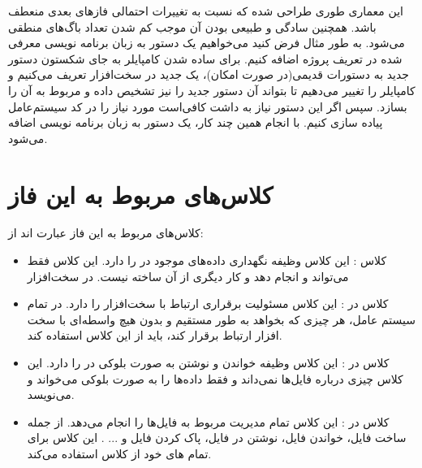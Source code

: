\documentclass{article}
\begin{document}
این معماری طوری طراحی شده که نسبت به تغییرات احتمالی فازهای بعدی منعطف باشد. همچنین سادگی و طبیعی بودن آن موجب کم شدن تعداد باگ‌های منطقی می‌شود. به طور مثال فرض کنید می‌خواهیم یک دستور به زبان برنامه نویسی معرفی شده در تعریف پروژه اضافه کنیم. برای ساده شدن کامپایلر به جای شکستون دستور جدید به دستورات قدیمی(در صورت امکان)، یک 
جدید در سخت‌افزار تعریف می‌کنیم و کامپایلر را تغییر می‌دهیم تا بتواند آن دستور جدید را نیز تشخیص داده و 
مربوط به آن‌ را بسازد. سپس اگر این دستور نیاز به 
داشت کافی‌است 
مورد نیاز را در کد سیستم‌عامل پیاده سازی کنیم. با انجام همین چند کار، یک دستور به زبان برنامه نویسی اضافه می‌شود. 

\section{کلاس‌های مربوط به این فاز}
کلاس‌های مربوط به این فاز عبارت اند از: 
\begin{itemize} 
\item
کلاس 
: 
این کلاس وظیفه نگهداری داده‌های موجود در 
را دارد. این کلاس فقط می‌تواند 
و 
انجام دهد و کار دیگری از آن ساخته نیست. 
در 
سخت‌افزار
\item
کلاس 
در 
:
این کلاس مسئولیت برقراری ارتباط با سخت‌افزار را دارد. در تمام سیستم عامل، هر چیزی که بخواهد به طور مستقیم و بدون هیچ واسطه‌ای با سخت افزار 
ارتباط برقرار کند، باید از این کلاس استفاده کند. 
\item 
کلاس 
در 
: 
این کلاس وظیفه خواندن و نوشتن به صورت بلوکی در 
را دارد. این کلاس چیزی درباره فایل‌ها نمی‌داند و فقط داده‌ها را به صورت بلوکی می‌خواند و می‌نویسد. 
\item 
کلاس 
در 
: 
این کلاس تمام مدیریت مربوط به فایل‌ها را انجام می‌دهد. از جمله ساخت فایل، خواندن فایل، نوشتن در فایل، پاک کردن فایل و ... . این کلاس برای تمام 
های خود از کلاس 
استفاده می‌کند. 
\end{itemize}
\end{document}
